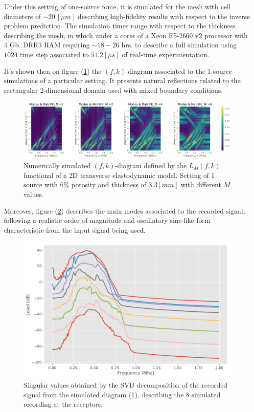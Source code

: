 \begin{rem}
Under this setting of one-source force, it is simulated for the mesh with cell diameters of $\sim 20 \, [\mu m]$ describing high-fidelity results with respect to the inverse problem prediction. The simulation times range with respect to the thickness describing the mesh, in which under a cores of a Xeon E5-2660 v2 processor with 4 Gb. DRR3 RAM requiring $\sim 18-26$ hrs. to describe a full simulation using $1024$ time step associated to $51.2 [\mu s]$ of real-time experimentation.
\end{rem}
It's shown then on figure (\ref{FK-DiagramS1P6M33}) the $(f,k)$-diagram associated to the 1-source simulations of a particular setting. It presents natural reflections related to the rectangular 2-dimensional domain used with mixed boundary conditions.
\begin{figure}[!h]
	\centering
	\includegraphics[width=\textwidth]{images/TimeSingSous/2DTime_P6ElasticFK33M1460_y.pdf}
	\caption{Numerically simulated $(f,k)$-diagram defined by the $L_M(f,k)$ functional of a 2D transverse elastodynamic model. Setting of 1 source with $6\%$ porosity and thickness of $3.3 [mm]$ with different $M$ values.}
	\label{FK-DiagramS1P6M33}
\end{figure}

Moreover, figure (\ref{SVD-S1P6M33}) describes the main modes associated to the recorded signal, following a realistic order of magnitude and oscillatory sine-like form characteristic from the input signal being used.
\begin{figure}[!h]
	\centering
	\includegraphics[scale=.5]{images/TimeSingSous/2DTime_P6Elastic33_SV.pdf}
	\caption{Singular values obtained by the SVD decomposition of the recorded signal from the simulated diagram (\ref{FK-DiagramS1P6M33}), describing the 8 simulated recording at the receptors.}
	\label{SVD-S1P6M33}
\end{figure}


